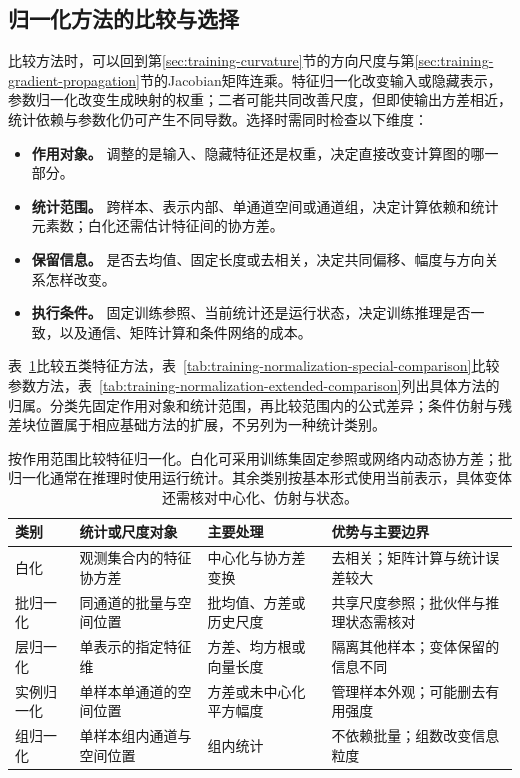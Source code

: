 \subsection{归一化方法的比较与选择}
\label{sec:training-normalization-comparison}
比较方法时，可以回到第\ref{sec:training-curvature}节的方向尺度与第\ref{sec:training-gradient-propagation}节的Jacobian矩阵连乘。特征归一化改变输入或隐藏表示，参数归一化改变生成映射的权重；二者可能共同改善尺度，但即使输出方差相近，统计依赖与参数化仍可产生不同导数。选择时需同时检查以下维度：
\begin{itemize}
  \item \textbf{作用对象。} 调整的是输入、隐藏特征还是权重，决定直接改变计算图的哪一部分。
  \item \textbf{统计范围。} 跨样本、表示内部、单通道空间或通道组，决定计算依赖和统计元素数；白化还需估计特征间的协方差。
  \item \textbf{保留信息。} 是否去均值、固定长度或去相关，决定共同偏移、幅度与方向关系怎样改变。
  \item \textbf{执行条件。} 固定训练参照、当前统计还是运行状态，决定训练推理是否一致，以及通信、矩阵计算和条件网络的成本。
\end{itemize}

表~\ref{tab:training-normalization-basic-comparison}比较五类特征方法，表~\ref{tab:training-normalization-special-comparison}比较参数方法，表~\ref{tab:training-normalization-extended-comparison}列出具体方法的归属。分类先固定作用对象和统计范围，再比较范围内的公式差异；条件仿射与残差块位置属于相应基础方法的扩展，不另列为一种统计类别。
\begin{table}[htbp]
  \centering\small
  \begin{tabularx}{\linewidth}{@{}p{24mm}p{43mm}p{35mm}X@{}}
    \toprule
    类别 & 统计或尺度对象 & 主要处理 & 优势与主要边界 \\
    \midrule
    白化 & 观测集合内的特征协方差 & 中心化与协方差变换 & 去相关；矩阵计算与统计误差较大 \\
    批归一化 & 同通道的批量与空间位置 & 批均值、方差或历史尺度 & 共享尺度参照；批伙伴与推理状态需核对 \\
    层归一化 & 单表示的指定特征维 & 方差、均方根或向量长度 & 隔离其他样本；变体保留的信息不同 \\
    实例归一化 & 单样本单通道的空间位置 & 方差或未中心化平方幅度 & 管理样本外观；可能删去有用强度 \\
    组归一化 & 单样本组内通道与空间位置 & 组内统计 & 不依赖批量；组数改变信息粒度 \\
    \bottomrule
  \end{tabularx}
  \caption{按作用范围比较特征归一化。白化可采用训练集固定参照或网络内动态协方差；批归一化通常在推理时使用运行统计。其余类别按基本形式使用当前表示，具体变体还需核对中心化、仿射与状态。}
  \label{tab:training-normalization-basic-comparison}
\end{table}
\FloatBarrier

